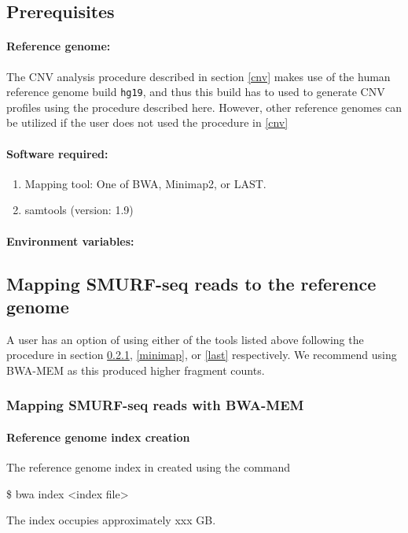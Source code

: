 \documentclass[11pt]{article}
\newenvironment{cmd}
{\par \noindent \ttfamily \$}
{\par \noindent}
\begin{document}
\subsection{Prerequisites}
\paragraph{Reference genome:} The CNV analysis procedure described in
section \ref{cnv} makes use of the human reference genome build
\texttt{hg19}, and thus this build has to used to generate CNV profiles
using the procedure described here. However, other reference genomes
can be utilized if the user does not used the procedure in \ref{cnv}

\paragraph{Software required:}
\begin{enumerate}
  \item Mapping tool: One of BWA, Minimap2, or LAST.
  \item samtools \cite{li2009sequence} (version: 1.9)
\end{enumerate}

\paragraph{Environment variables:}


\subsection{Mapping SMURF-seq reads to the reference genome}

A user has an option of using either of the tools listed above following
the procedure in section \ref{bwa}, \ref{minimap}, or \ref{last}
respectively. We recommend using BWA-MEM as this produced higher
fragment counts.

\subsubsection{Mapping SMURF-seq reads with BWA-MEM}
\label{bwa}
\paragraph{Reference genome index creation}
The reference genome index in created using the command
\begin{cmd}
  bwa index <index file>
\end{cmd}
The index occupies approximately xxx GB.
\end{document}
